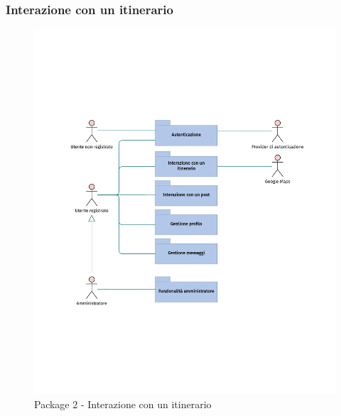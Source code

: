 \documentclass{natourDoc}
\begin{document}
\subsubsection{Interazione con un itinerario}
\begin{figure}[!htbp]
	\centering
	\includegraphics[width=\textwidth, page=3]{./diagrams/useCase.pdf}
	\caption{Package 2 - Interazione con un itinerario}
\end{figure}
\FloatBarrier

\newpage
\end{document}
